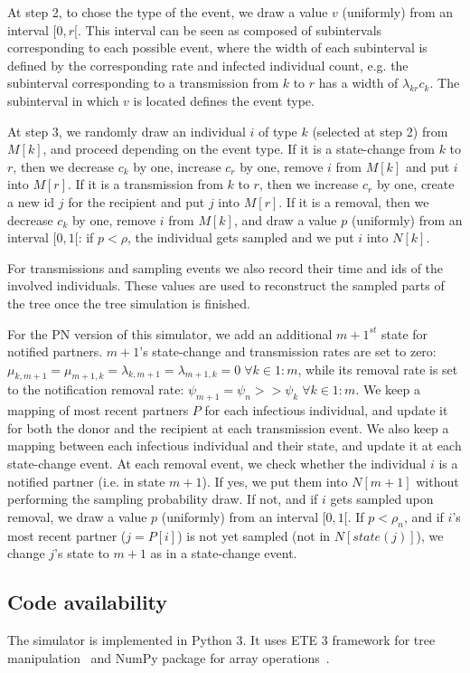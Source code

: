 \documentclass[a4paper,10pt]{article}
\begin{document}
At step 2, to chose the type of the event, we draw a value $v$ (uniformly) from an interval $[0, r[$. This interval can be seen as composed of subintervals corresponding to each possible event, where the width of each subinterval is defined by the corresponding rate and infected individual count, e.g. the subinterval corresponding to a transmission from $k$ to $r$ has a width of $\lambda_{kr}c_k$. The subinterval in which $v$ is located defines the event type.

At step 3, we randomly draw an individual $i$ of type $k$ (selected at step 2) from $M[k]$, and proceed depending on the event type. If it is a state-change from $k$ to $r$, then we decrease $c_k$ by one, increase $c_r$ by one, remove $i$ from $M[k]$ and put $i$ into $M[r]$. If it is a transmission from $k$ to $r$, then we increase $c_r$ by one, create a new id $j$ for the recipient and put $j$ into $M[r]$. If it is a removal, then we decrease $c_k$ by one, remove $i$ from $M[k]$, and draw a value $p$ (uniformly) from an interval $[0, 1[$: if $p < \rho$, the individual gets sampled and we put $i$ into $N[k]$. 

For transmissions and sampling events we also record their time and ids of the involved individuals. These values are used to reconstruct the sampled parts of the tree once the tree simulation is finished.


For the PN version of this simulator, we add an additional $m+1^{st}$ state for notified partners. $m + 1$'s state-change and transmission rates are set to zero: $\mu_{k,m+1} = \mu_{m+1,k} = \lambda_{k,m+1} = \lambda_{m+1,k} = 0\; \forall k \in 1:m$, while its removal rate is set to the notification removal rate: $\psi_{m+1} = \psi_n >> \psi_k\; \forall k \in 1:m$. We keep a mapping of most recent partners $P$ for each infectious individual, and update it for both the donor and the recipient at each transmission event. We also keep a mapping between each infectious individual and their state, and update it at each state-change event. At each removal event, we check whether the individual $i$ is a notified partner (i.e. in state $m+1$). If yes, we put them into $N[m+1]$ without performing the sampling probability draw. If not, and if $i$ gets sampled upon removal, we draw a value $p$ (uniformly) from an interval $[0, 1[$. If $p < \rho_n$, and if $i$'s most recent partner ($j = P[i]$) is not yet sampled (not in $N[state(j)]$), we change $j$'s state to $m + 1$ as in a state-change event.


\subsection*{Code availability}
The simulator is implemented in Python 3. It uses ETE 3 framework for tree manipulation~\cite{Huerta-Cepas2016} and NumPy package for array operations~\cite{harris_array_2020}. 
\end{document}
